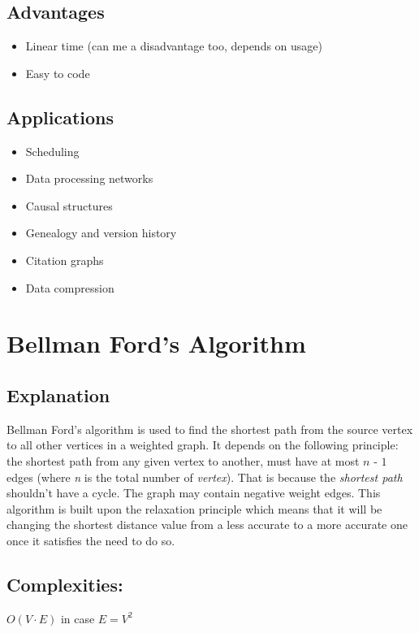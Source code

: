 \documentclass[]{article}
\begin{document}
	\subsection{Advantages}
	\begin{itemize}
		\item Linear time (can me a disadvantage too, depends on usage)
		\item Easy to code
	\end{itemize}

	\subsection{Applications}
	\begin{itemize}
		\item Scheduling
		\item Data processing networks
		\item Causal structures
		\item Genealogy and version history
		\item Citation graphs
		\item Data compression
	\end{itemize}




\section{Bellman Ford's Algorithm}
	\subsection{Explanation}
	\par Bellman Ford's algorithm is used to find the shortest path from the source vertex to all other vertices in a weighted graph. It depends on the following principle: the shortest path from any given vertex to another, must have at most $\textit{n - 1}$ edges (where \textit{n} is the total number of \textit{vertex}). That is because the \textit{shortest path} shouldn't have a cycle. The graph may contain negative weight edges. This algorithm is built upon the relaxation principle which means that it will be changing the shortest distance value from a less accurate to a more accurate one once it satisfies the need to do so\cite{ShortestPathAlgorithms}.
	
	\subsection{Complexities:}
	\textit{$O(V \cdot E)$} in case \textit{$E=V^2$}
\end{document}
